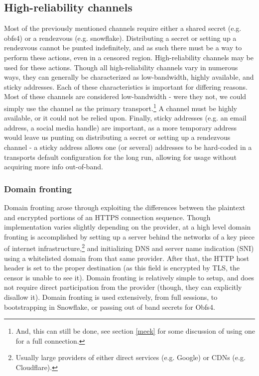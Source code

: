 \documentclass[12pt]{report}
\begin{document}
\subsection{High-reliability channels}

Most of the previously mentioned channels require either a shared secret (e.g. obfs4) or a rendezvous (e.g. snowflake). Distributing a secret or setting up a rendezvous cannot be punted indefinitely, and as such there must be a way to perform these actions, even in a censored region. High-reliability channels may be used for these actions. Though all high-reliability channels vary in numerous ways, they can generally be characterized as low-bandwidth, highly available, and sticky addresses. Each of these characteristics is important for differing reasons. Most of these channels are considered low-bandwidth - were they not, we could simply use the channel as the primary transport.\footnote{And, this can still be done, see section \ref{meek} for some discussion of using one for a full connection.} A channel must be highly available, or it could not be relied upon. Finally, sticky addresses (e.g. an email address, a social media handle) are important, as a more temporary address would leave us punting on distributing a secret or setting up a rendezvous channel - a sticky address allows one (or several) addresses to be hard-coded in a transports default configuration for the long run, allowing for usage without acquiring more info out-of-band.

\subsubsection{Domain fronting}
\label{domain fronting}

Domain fronting arose through exploiting the differences between the plaintext and encrypted portions of an HTTPS connection sequence. Though implementation varies slightly depending on the provider, at a high level domain fronting is accomplished by setting up a server behind the networks of a key piece of internet infrastructure,\footnote{Usually large providers of either direct services (e.g. Google) or CDNs (e.g. Cloudflare).} and initializing DNS and server name indication (SNI) using a whitelisted domain from that same provider. After that, the HTTP host header is set to the proper destination (as this field is encrypted by TLS, the censor is unable to see it). Domain fronting is relatively simple to setup, and does not require direct participation from the provider (though, they can explicitly disallow it).\cite{domain fronting} Domain fronting is used extensively, from full sessions,\cite{meek} to bootstrapping in Snowflake, or passing out of band secrets for Obfs4.
\end{document}
